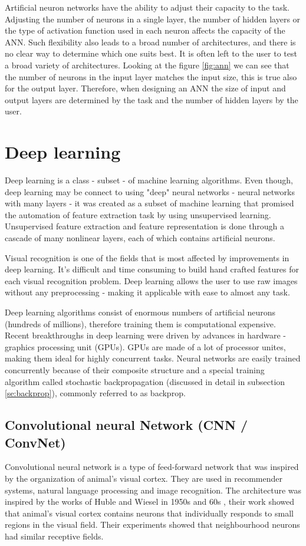 \documentclass[times, utf8, diplomski]{fer}
\begin{document}
Artificial neuron networks have the ability to adjust their capacity to the task. Adjusting the number of neurons in a single layer, the number of hidden layers or the type of activation function used in each neuron affects the capacity of the ANN. Such flexibility also leads to a broad number of architectures, and there is no clear way to determine which one suits best. It is often left to the user to test a broad variety of architectures. Looking at the figure \ref{fig:ann} we can see that the number of neurons in the input layer matches the input size, this is true also for the output layer. Therefore, when designing an ANN the size of input and output layers are determined by the task and the number of hidden layers by the user.


\section{Deep learning}
Deep learning is a class - subset - of machine learning algorithms. Even though, deep learning may be connect to using "deep" neural networks - neural networks with many layers - it was created as a subset of machine learning that promised the automation of feature extraction task by using unsupervised learning. Unsupervised feature extraction and feature representation is done through a cascade of many nonlinear layers, each of which contains artificial neurons. 

Visual recognition is one of the fields that is most affected by improvements in deep learning. It's difficult and time consuming to build hand crafted features for each visual recognition problem. Deep learning allows the user to use raw images without any preprocessing - making it applicable with ease to almost any task.

Deep learning algorithms consist of enormous numbers of  artificial neurons (hundreds of millions), therefore training them is computational expensive. Recent breakthroughs in deep learning were driven by advances in hardware - graphics processing unit (GPUs). GPUs are made of a lot of processor unites, making them ideal for highly concurrent tasks. Neural networks are easily trained concurrently because of their composite structure and a special training algorithm called stochastic backpropagation (discussed in detail in subsection \ref{se:backprop}), commonly referred to as backprop.

\subsection{Convolutional neural Network (CNN /  ConvNet)}
Convolutional neural network is a type of feed-forward network that was inspired by the organization of animal's visual cortex. They are used in recommender systems, natural language processing and image recognition. The architecture was inspired by the works of Huble and Wiesel in 1950s and 60s \citep{hubel_receptive_1968}, their work showed that animal's visual cortex contains neurons that individually responds to small regions in the visual field. Their experiments showed that neighbourhood neurons had similar receptive fields.
\end{document}
